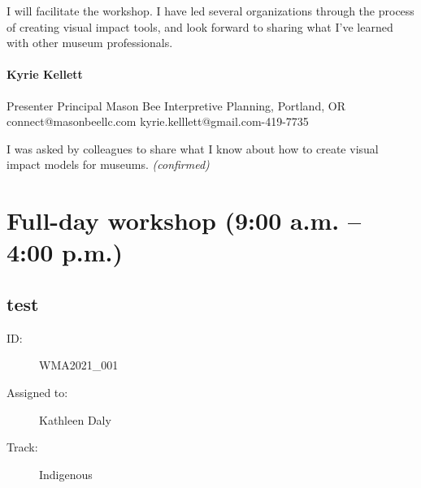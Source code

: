 \documentclass{report}
\begin{document}
              I will facilitate the workshop. I have led several organizations through the process of creating visual impact tools, and look forward to sharing what I've learned with other museum professionals.\newline


              

              
                \subsubsection*{ Kyrie Kellett }
                Presenter\newline
                Principal\newline
                Mason Bee Interpretive Planning, Portland, OR
                \newline
                connect@masonbeellc.com\newline
                kyrie.kelllett@gmail.com-419-7735\newline

                I was asked by colleagues to share what I know about how to create visual impact models for museums.
                \emph{ (confirmed) }
              

              

              

              
    \newpage
    \chapter*{ Full-day workshop (9:00 a.m. – 4:00 p.m.) }

      
        
        
          \newpage
          \section{ test }
            \begin{description}
              \item [ID:]
              WMA2021\_001

              \item [Assigned to:]Kathleen Daly~
                \item [Track:]Indigenous~
              \end{description}
\end{document}
